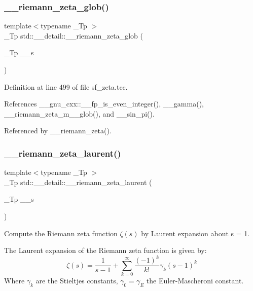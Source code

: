 \subsubsection{\texorpdfstring{\+\_\+\+\_\+riemann\+\_\+zeta\+\_\+glob()}{\_\_riemann\_zeta\_glob()}}
{\footnotesize\ttfamily template$<$typename \+\_\+\+Tp $>$ \\
\+\_\+\+Tp std\+::\+\_\+\+\_\+detail\+::\+\_\+\+\_\+riemann\+\_\+zeta\+\_\+glob (\begin{DoxyParamCaption}\item[{\+\_\+\+Tp}]{\+\_\+\+\_\+s }\end{DoxyParamCaption})}



Definition at line 499 of file sf\+\_\+zeta.\+tcc.



References \+\_\+\+\_\+gnu\+\_\+cxx\+::\+\_\+\+\_\+fp\+\_\+is\+\_\+even\+\_\+integer(), \+\_\+\+\_\+gamma(), \+\_\+\+\_\+riemann\+\_\+zeta\+\_\+m\+\_\+\_\+glob(), and \+\_\+\+\_\+sin\+\_\+pi().



Referenced by \+\_\+\+\_\+riemann\+\_\+zeta().

\mbox{\label{namespacestd_1_1____detail_a5aa95e3482a58e4bd0a7f8395f88fe1c}} 
\subsubsection{\texorpdfstring{\+\_\+\+\_\+riemann\+\_\+zeta\+\_\+laurent()}{\_\_riemann\_zeta\_laurent()}}
{\footnotesize\ttfamily template$<$typename \+\_\+\+Tp $>$ \\
\+\_\+\+Tp std\+::\+\_\+\+\_\+detail\+::\+\_\+\+\_\+riemann\+\_\+zeta\+\_\+laurent (\begin{DoxyParamCaption}\item[{\+\_\+\+Tp}]{\+\_\+\+\_\+s }\end{DoxyParamCaption})}



Compute the Riemann zeta function $ \zeta(s) $ by Laurent expansion about s = 1. 

The Laurent expansion of the Riemann zeta function is given by\+: \[ \zeta(s) = \frac{1}{s-1} + \sum_{k=0}^{\infty} \frac{(-1)^k}{k!}\gamma_k (s-1)^k \] Where $ \gamma_k $ are the Stieltjes constants, $ \gamma_0 = \gamma_E $ the Euler-\/\+Mascheroni constant.

